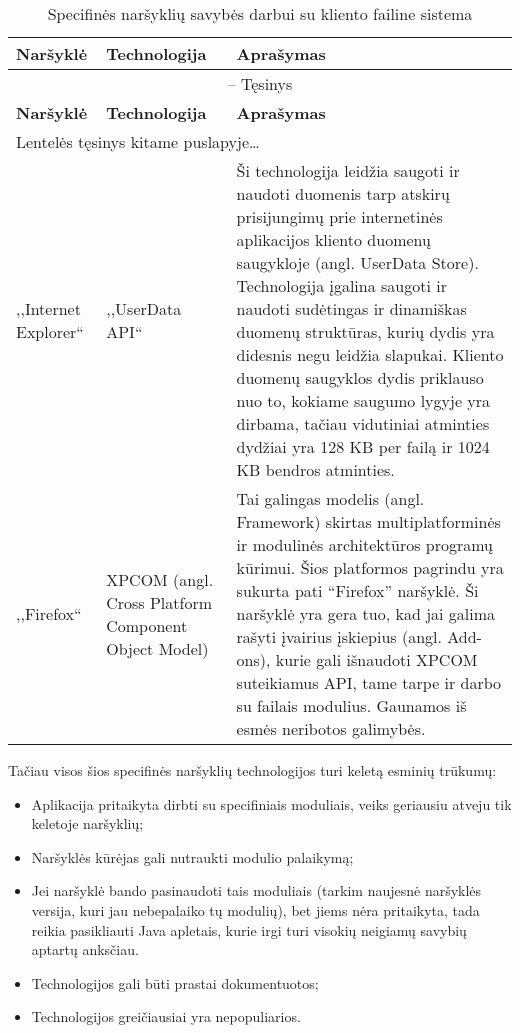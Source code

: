 \documentclass[12pt,a4paper,titlepage]{article}
\begin{document}
\begin{longtable}{|p{2cm}|p{3cm}|p{7.8cm}|}
\caption{Specifinės naršyklių savybės darbui su kliento failine sistema \label{table:naršyklės}}\\

\hline \hline
{\textbf{Naršyklė}} &
{\textbf{Technologija}} &
{\textbf{Aprašymas}}\\
\hline
\endfirsthead


\multicolumn{3}{c}{{\tablename} \thetable{} -- Tęsinys} \\[0.5ex]
\hline \hline
{\textbf{Naršyklė}} &
{\textbf{Technologija}} &
{\textbf{Aprašymas}}\\
\hline
\endhead


\multicolumn{3}{l}{{Lentelės tęsinys kitame puslapyje\ldots}} \\
\endfoot


\hline \hline
\endlastfoot
\hline 
,,Internet Explorer``
&
,,UserData API``
&
Ši technologija leidžia saugoti ir naudoti duomenis tarp atskirų prisijungimų prie internetinės aplikacijos kliento duomenų saugykloje (angl. UserData Store). Technologija įgalina saugoti ir naudoti sudėtingas ir dinamiškas duomenų struktūras, kurių dydis yra didesnis negu leidžia slapukai. Kliento duomenų saugyklos dydis priklauso nuo to, kokiame saugumo lygyje yra dirbama, tačiau vidutiniai atminties dydžiai yra 128 KB per failą ir 1024 KB bendros atminties.
\\
\hline
,,Firefox``
&
XPCOM (angl. Cross Platform Component Object Model)
&
Tai galingas modelis (angl. Framework) skirtas multiplatforminės ir modulinės architektūros programų kūrimui. Šios platformos pagrindu yra sukurta pati “Firefox” naršyklė. Ši naršyklė yra gera tuo, kad jai galima rašyti įvairius įskiepius (angl. Add-ons), kurie gali išnaudoti XPCOM suteikiamus API, tame tarpe ir darbo su failais modulius. Gaunamos iš esmės neribotos galimybės.
\end{longtable}

Tačiau visos šios specifinės naršyklių technologijos turi keletą esminių trūkumų:
\begin{itemize}
  \item Aplikacija pritaikyta dirbti su specifiniais moduliais, veiks geriausiu atveju tik keletoje naršyklių;
  \item Naršyklės kūrėjas gali nutraukti modulio palaikymą;
  \item Jei naršyklė bando pasinaudoti tais moduliais (tarkim naujesnė naršyklės versija, kuri jau nebepalaiko tų modulių), bet jiems nėra pritaikyta, tada reikia pasikliauti Java apletais, kurie irgi turi visokių neigiamų savybių aptartų anksčiau.
  \item Technologijos gali būti prastai dokumentuotos;
  \item Technologijos greičiausiai yra nepopuliarios.
\end{itemize}
\end{document}
